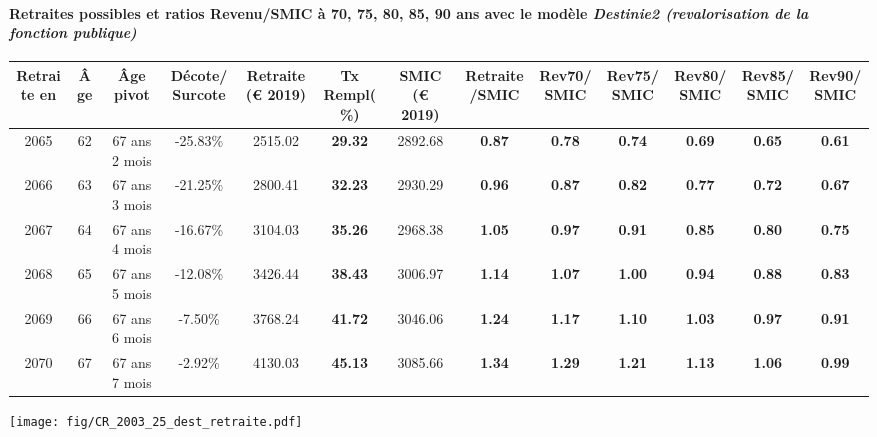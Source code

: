 \paragraph{Retraites possibles et ratios Revenu/SMIC à 70, 75, 80, 85, 90 ans avec le modèle \emph{Destinie2 (revalorisation de la fonction publique)}}  
 
{ \scriptsize \begin{center} 
\begin{tabular}[htb]{|c|c||c|c||c|c||c||c|c|c|c|c|c|} 
\hline 
 Retraite en &  Âge &  Âge pivot &  Décote/Surcote &  Retraite (\euro{} 2019) &  Tx Rempl(\%) &  SMIC (\euro{} 2019) &  Retraite/SMIC &  Rev70/SMIC &  Rev75/SMIC &  Rev80/SMIC &  Rev85/SMIC &  Rev90/SMIC \\ 
\hline \hline 
 2065 &  62 &  67 ans 2 mois &  -25.83\% &  2515.02 &  {\bf 29.32} &  2892.68 &  {\bf {\color{red} 0.87}} &  {\bf {\color{red} 0.78}} &  {\bf {\color{red} 0.74}} &  {\bf {\color{red} 0.69}} &  {\bf {\color{red} 0.65}} &  {\bf {\color{red} 0.61}} \\ 
\hline 
 2066 &  63 &  67 ans 3 mois &  -21.25\% &  2800.41 &  {\bf 32.23} &  2930.29 &  {\bf {\color{red} 0.96}} &  {\bf {\color{red} 0.87}} &  {\bf {\color{red} 0.82}} &  {\bf {\color{red} 0.77}} &  {\bf {\color{red} 0.72}} &  {\bf {\color{red} 0.67}} \\ 
\hline 
 2067 &  64 &  67 ans 4 mois &  -16.67\% &  3104.03 &  {\bf 35.26} &  2968.38 &  {\bf 1.05} &  {\bf {\color{red} 0.97}} &  {\bf {\color{red} 0.91}} &  {\bf {\color{red} 0.85}} &  {\bf {\color{red} 0.80}} &  {\bf {\color{red} 0.75}} \\ 
\hline 
 2068 &  65 &  67 ans 5 mois &  -12.08\% &  3426.44 &  {\bf 38.43} &  3006.97 &  {\bf 1.14} &  {\bf 1.07} &  {\bf 1.00} &  {\bf {\color{red} 0.94}} &  {\bf {\color{red} 0.88}} &  {\bf {\color{red} 0.83}} \\ 
\hline 
 2069 &  66 &  67 ans 6 mois &  -7.50\% &  3768.24 &  {\bf 41.72} &  3046.06 &  {\bf 1.24} &  {\bf 1.17} &  {\bf 1.10} &  {\bf 1.03} &  {\bf {\color{red} 0.97}} &  {\bf {\color{red} 0.91}} \\ 
\hline 
 2070 &  67 &  67 ans 7 mois &  -2.92\% &  4130.03 &  {\bf 45.13} &  3085.66 &  {\bf 1.34} &  {\bf 1.29} &  {\bf 1.21} &  {\bf 1.13} &  {\bf 1.06} &  {\bf {\color{red} 0.99}} \\ 
\hline 
\hline 
\end{tabular} 
\end{center} } 

 \begin{center}\texttt{[image: fig/CR\_2003\_25\_dest\_retraite.pdf]}\end{center} \label{fig/CR_2003_25_dest_retraite.pdf} 

